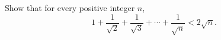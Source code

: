 Show that for every positive integer $n$,
\[1+\dfrac1{\sqrt2}+\dfrac1{\sqrt3}+\cdots+\dfrac1{\sqrt n}<2\sqrt n.\]
